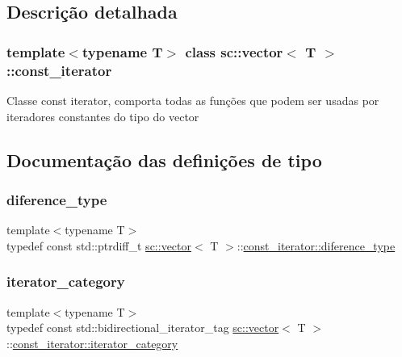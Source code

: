 \subsection{Descrição detalhada}
\subsubsection*{template$<$typename T$>$\newline
class sc\+::vector$<$ T $>$\+::const\+\_\+iterator}

Classe const iterator, comporta todas as funções que podem ser usadas por iteradores constantes do tipo do vector 

\subsection{Documentação das definições de tipo}
\mbox{\label{classsc_1_1vector_1_1const__iterator_ad232a0c43ebe4c40068c1bd538dc818c}} 
\subsubsection{\texorpdfstring{diference\+\_\+type}{diference\_type}}
{\footnotesize\ttfamily template$<$typename T$>$ \\
typedef const std\+::ptrdiff\+\_\+t \mbox{\hyperlink{classsc_1_1vector}{sc\+::vector}}$<$ T $>$\+::\mbox{\hyperlink{classsc_1_1vector_1_1const__iterator_ad232a0c43ebe4c40068c1bd538dc818c}{const\+\_\+iterator\+::diference\+\_\+type}}}

\mbox{\label{classsc_1_1vector_1_1const__iterator_ae949cc3e49289e4d69bcc20d2d6dca33}} 
\subsubsection{\texorpdfstring{iterator\+\_\+category}{iterator\_category}}
{\footnotesize\ttfamily template$<$typename T$>$ \\
typedef const std\+::bidirectional\+\_\+iterator\+\_\+tag \mbox{\hyperlink{classsc_1_1vector}{sc\+::vector}}$<$ T $>$\+::\mbox{\hyperlink{classsc_1_1vector_1_1const__iterator_ae949cc3e49289e4d69bcc20d2d6dca33}{const\+\_\+iterator\+::iterator\+\_\+category}}}

